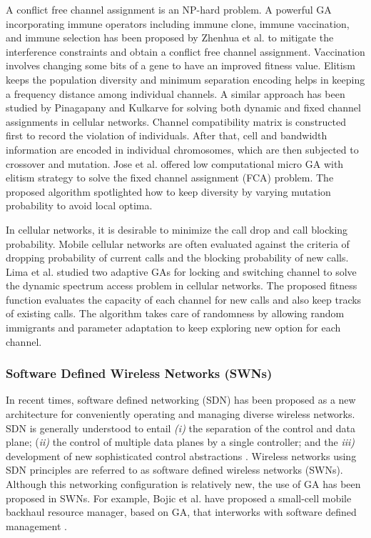 \documentclass[journal]{IEEEtran}
\begin{document}
A conflict free channel assignment is an NP-hard problem. A powerful GA incorporating immune operators including immune clone, immune vaccination, and immune selection has been proposed by Zhenhua et al. \cite{zhenhua2010modified} to mitigate the interference constraints and obtain a conflict free channel assignment. Vaccination involves changing some bits of a gene to have an improved fitness value. Elitism keeps the population diversity and minimum separation encoding helps in keeping a frequency distance among individual channels. A similar approach has been studied by Pinagapany and Kulkarve \cite{pinagapany2008solving} for solving both dynamic and fixed channel assignments in cellular networks. Channel compatibility matrix is constructed first to record the violation of individuals. After that, cell and bandwidth information are encoded in individual chromosomes, which are then subjected to crossover and mutation. Jose et al. \cite{jose2007new} offered low computational micro GA with elitism strategy to solve the fixed channel assignment (FCA) problem. The proposed algorithm spotlighted how to keep diversity by varying mutation probability to avoid local optima. 

In cellular networks, it is desirable to minimize the call drop and call blocking probability. Mobile cellular networks are often evaluated against the criteria of dropping probability of current calls and the blocking probability of new calls. Lima et al. \cite{lima2007adaptive} studied two adaptive GAs for locking and switching channel to solve the dynamic spectrum access problem in cellular networks. The proposed fitness function evaluates the capacity of each channel for new calls and also keep tracks of existing calls. The algorithm takes care of randomness by allowing random immigrants and parameter adaptation to keep exploring new option for each channel.

\vspace{2mm} 
\subsubsection{Software Defined Wireless Networks (SWNs)}

In recent times, software defined networking (SDN) has been proposed as a new architecture for conveniently operating and managing diverse wireless networks. SDN is generally understood to entail \textit{(i)} the separation of the control and data plane; (\textit{ii)} the control of multiple data planes by a single controller; and the \textit{iii)} development of new sophisticated control abstractions \cite{qadir2014prog}. Wireless networks using SDN principles are referred to as software defined wireless networks (SWNs). Although this networking configuration is relatively new, the use of GA has been proposed in SWNs. For example, Bojic et al. have proposed a small-cell mobile backhaul resource manager, based on GA, that interworks with software defined management \cite{bojic2013advanced}. 
\end{document}
